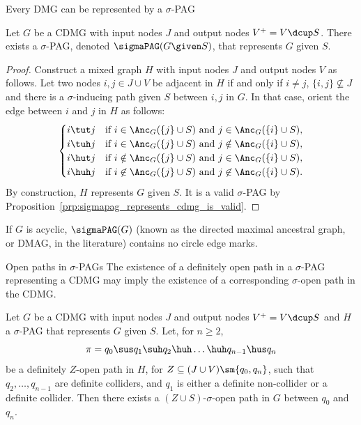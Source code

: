 \begin{frame}{Every DMG can be represented by a $\sigma$-PAG}
\begin{Prp}[\ref{prp:from_cdmg_to_sigmapag}]
  Let $G$ be a CDMG with input nodes $J$ and output nodes $V^+ = V \dcup S$. 
  There exists a $\sigma$-PAG, denoted $\sigmaPAG(G \given S)$, that represents $G$ given $S$.
\end{Prp}
\begin{proof}
  Construct a mixed graph $H$ with input nodes $J$ and output nodes $V$ as follows.
  Let two nodes $i,j \in J\cup V$ be adjacent in $H$ if and only if $i \ne j$, $\{i,j\} \not\subseteq J$ and there is a $\sigma$-inducing path given $S$ between $i,j$ in $G$.
  In that case, orient the edge between $i$ and $j$ in $H$ as follows:
\setlength\abovedisplayskip{5pt}
\setlength\belowdisplayskip{5pt}
    $$\begin{cases}
      \text{$i \tut j$} & \text{if $i \in \Anc_G(\{j\} \cup S)$ and $j \in \Anc_G(\{i\} \cup S)$}, \\
      \text{$i \tuh  j$} & \text{if $i \in \Anc_G(\{j\} \cup S)$ and $j \notin \Anc_G(\{i\} \cup S)$}, \\
      \text{$i \hut  j$} & \text{if $i \notin \Anc_G(\{j\} \cup S)$ and $j \in \Anc_G(\{i\} \cup S)$}, \\
      \text{$i \huh j$} & \text{if $i \not\in \Anc_G(\{j\} \cup S)$ and $j \not\in \Anc_G(\{i\} \cup S)$.}
    \end{cases}$$
  By construction, $H$ represents $G$ given $S$.
  It is a valid $\sigma$-PAG by Proposition~\ref{prp:sigmapag_represents_cdmg_is_valid}.
\end{proof}
If $G$ is acyclic, $\sigmaPAG(G)$ (known as the directed maximal ancestral graph, or DMAG, in the literature) contains no circle edge marks.
\end{frame}

\begin{frame}{Open paths in $\sigma$-PAGs}
The existence of a definitely open path in a $\sigma$-PAG representing a CDMG may imply the existence of a corresponding $\sigma$-open path in the CDMG.
\begin{Prp}[\ref{prp:sigmapag_open_walk_implies_cdmg_open_walk}]
  Let $G$ be a CDMG with input nodes $J$ and output nodes $V^+ = V \dcup S$ and $H$ a $\sigma$-PAG that represents $G$ given $S$.
  Let, for $n \ge 2$,
    \[\pi = q_0 \sus q_1 \suh q_2 \huh \dots \huh q_{n-1} \hus q_n\] 
  be a definitely $Z$-open path in $H$, for $Z \subseteq (J \cup V) \sm \{q_0,q_n\}$,
  such that $q_2, \dots, q_{n-1}$ are definite colliders, and $q_{1}$ is either a definite non-collider or a definite collider.
  Then there exists a $(Z \cup S)$-$\sigma$-open path in $G$ between $q_0$ and $q_n$.
\end{Prp}
\end{frame}

